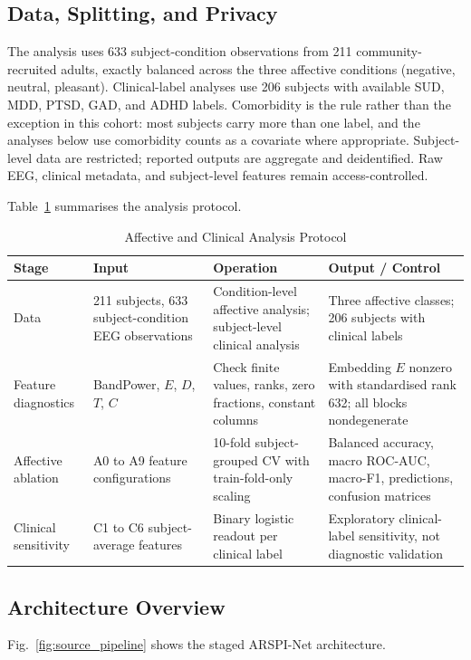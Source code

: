 \documentclass[journal]{IEEEtran}
\begin{document}
\subsection{Data, Splitting, and Privacy}
The analysis uses 633 subject-condition observations from 211 community-recruited adults, exactly balanced across the three affective conditions (negative, neutral, pleasant). Clinical-label analyses use 206 subjects with available SUD, MDD, PTSD, GAD, and ADHD labels. Comorbidity is the rule rather than the exception in this cohort: most subjects carry more than one label, and the analyses below use comorbidity counts as a covariate where appropriate. Subject-level data are restricted; reported outputs are aggregate and deidentified. Raw EEG, clinical metadata, and subject-level features remain access-controlled.

Table~\ref{tab:protocol} summarises the analysis protocol.

\begin{table}[!t]
\caption{Affective and Clinical Analysis Protocol}
\label{tab:protocol}
\centering
\footnotesize
\begin{tabular}{p{}p{}p{}p{}}
\toprule
Stage & Input & Operation & Output / Control \\
\midrule
Data & 211 subjects, 633 subject-condition EEG observations & Condition-level affective analysis; subject-level clinical analysis & Three affective classes; 206 subjects with clinical labels \\
Feature diagnostics & BandPower, $E$, $D$, $T$, $C$ & Check finite values, ranks, zero fractions, constant columns & Embedding $E$ nonzero with standardised rank 632; all blocks nondegenerate \\
Affective ablation & A0 to A9 feature configurations & 10-fold subject-grouped CV with train-fold-only scaling & Balanced accuracy, macro ROC-AUC, macro-F1, predictions, confusion matrices \\
Clinical sensitivity & C1 to C6 subject-average features & Binary logistic readout per clinical label & Exploratory clinical-label sensitivity, not diagnostic validation \\
\bottomrule
\end{tabular}
\end{table}

\subsection{Architecture Overview}
Fig.~\ref{fig:source_pipeline} shows the staged ARSPI-Net architecture.
\end{document}
